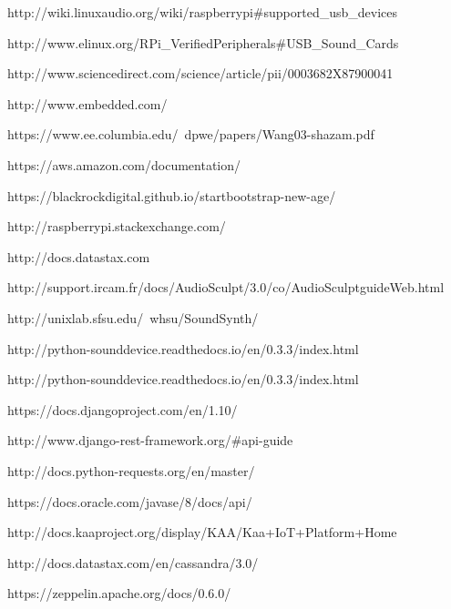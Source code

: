 
http://wiki.linuxaudio.org/wiki/raspberrypi#supported_usb_devices

http://www.elinux.org/RPi_VerifiedPeripherals#USB_Sound_Cards

http://www.sciencedirect.com/science/article/pii/0003682X87900041

http://www.embedded.com/

https://www.ee.columbia.edu/~dpwe/papers/Wang03-shazam.pdf

https://aws.amazon.com/documentation/

https://blackrockdigital.github.io/startbootstrap-new-age/

http://raspberrypi.stackexchange.com/

http://docs.datastax.com

http://support.ircam.fr/docs/AudioSculpt/3.0/co/AudioSculptguideWeb.html

http://unixlab.sfsu.edu/~whsu/SoundSynth/

http://python-sounddevice.readthedocs.io/en/0.3.3/index.html

http://python-sounddevice.readthedocs.io/en/0.3.3/index.html

https://docs.djangoproject.com/en/1.10/

http://www.django-rest-framework.org/#api-guide

http://docs.python-requests.org/en/master/

https://docs.oracle.com/javase/8/docs/api/

http://docs.kaaproject.org/display/KAA/Kaa+IoT+Platform+Home

http://docs.datastax.com/en/cassandra/3.0/

https://zeppelin.apache.org/docs/0.6.0/
